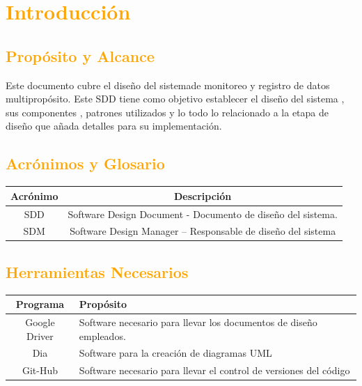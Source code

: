 \newpage
\section{\textcolor{orange}{Introducción}}
\subsection{\textcolor{orange}{Propósito y Alcance}}
Este documento cubre el diseño del sistemade monitoreo y registro de datos multipropósito. Este SDD tiene como objetivo establecer el diseño del sistema , sus componentes , patrones utilizados y lo todo lo relacionado a la etapa de diseño que añada detalles para su implementación. 

\subsection{\textcolor{orange}{Acrónimos y Glosario}}
\begin{table}[!h]
\begin{center}
\begin{tabular}{|c|c|}
\hline
\rowcolor[RGB]{255,127,0} Acrónimo & Descripción \\
\hline
SDD & Software Design Document - Documento de diseño del sistema. \\
\hline
SDM & Software Design Manager – Responsable de diseño del sistema\\
\hline
\end{tabular}
\end{center}
\end{table}

\subsection{\textcolor{orange}{Herramientas Necesarios}}
\begin{table}[!h]
\begin{center}
\begin{tabular}{|c|p{100mm}|}
\hline
\rowcolor[RGB]{255,127,0} Programa & Propósito \\
\hline
Google Driver & Software necesario para llevar los documentos de diseño empleados.\\
\hline
Dia & Software para la creación de diagramas UML\\
\hline
Git-Hub & Software necesario para llevar el control de versiones del código \\
\hline
\end{tabular}
\end{center}
\end{table}

